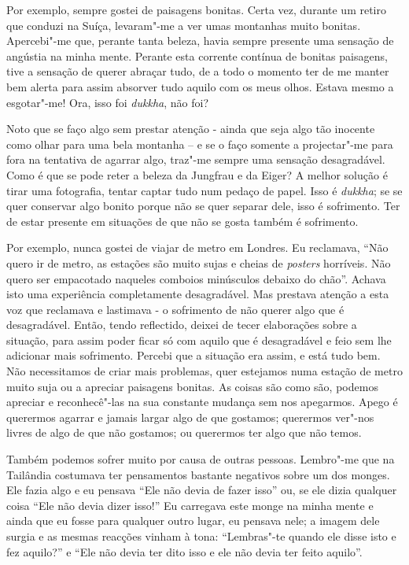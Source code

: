 Por exemplo, sempre gostei de paisagens bonitas. Certa vez, durante um retiro
que conduzi na Suíça, levaram"-me a ver umas montanhas muito bonitas. Apercebi"-me
que, perante tanta beleza, havia sempre presente uma sensação de angústia na
minha mente. Perante esta corrente contínua de bonitas paisagens, tive a
sensação de querer abraçar tudo, de a todo o momento ter de me manter bem alerta
para assim absorver tudo aquilo com os meus olhos. Estava mesmo a esgotar"-me!
Ora, isso foi \emph{dukkha}, não foi?

Noto que se faço algo sem prestar atenção - ainda que seja algo tão inocente
como olhar para uma bela montanha -- e se o faço somente a projectar"-me para fora
na tentativa de agarrar algo, traz"-me sempre uma sensação desagradável. Como é
que se pode reter a beleza da Jungfrau e da Eiger? A melhor solução é tirar uma
fotografia, tentar captar tudo num pedaço de papel. Isso é \emph{dukkha}; se se
quer conservar algo bonito porque não se quer separar dele, isso é sofrimento.
Ter de estar presente em situações de que não se gosta também é sofrimento.

Por exemplo, nunca gostei de viajar de metro em Londres. Eu reclamava, “Não
quero ir de metro, as estações são muito sujas e cheias de \emph{posters}
horríveis. Não quero ser empacotado naqueles comboios minúsculos debaixo do
chão”. Achava isto uma experiência completamente desagradável. Mas prestava
atenção a esta voz que reclamava e lastimava - o sofrimento de não querer algo
que é desagradável. Então, tendo reflectido, deixei de tecer elaborações sobre a
situação, para assim poder ficar só com aquilo que é desagradável e feio sem lhe
adicionar mais sofrimento. Percebi que a situação era assim, e está tudo bem.
Não necessitamos de criar mais problemas, quer estejamos numa estação de metro
muito suja ou a apreciar paisagens bonitas. As coisas são como são, podemos
apreciar e reconhecê"-las na sua constante mudança sem nos apegarmos. Apego é
querermos agarrar e jamais largar algo de que gostamos; querermos ver"-nos livres
de algo de que não gostamos; ou querermos ter algo que não temos.

Também podemos sofrer muito por causa de outras pessoas. Lembro"-me que na
Tailândia costumava ter pensamentos bastante negativos sobre um dos monges. Ele
fazia algo e eu pensava “Ele não devia de fazer isso” ou, se ele dizia qualquer
coisa “Ele não devia dizer isso!” Eu carregava este monge na minha mente e
ainda que eu fosse para qualquer outro lugar, eu pensava nele; a imagem dele
surgia e as mesmas reacções vinham à tona: “Lembras"-te quando ele disse isto e
fez aquilo?” e “Ele não devia ter dito isso e ele não devia ter feito aquilo”.

